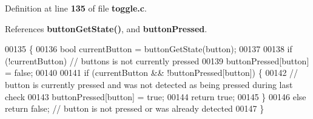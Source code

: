 Definition at line \textbf{ 135} of file \textbf{ toggle.\+c}.



References \textbf{ button\+Get\+State()}, and \textbf{ button\+Pressed}.


\begin{DoxyCode}
00135                                        \{
00136     \textcolor{keywordtype}{bool} currentButton = buttonGetState(button);
00137 
00138     \textcolor{keywordflow}{if} (!currentButton) \textcolor{comment}{// buttons is not currently pressed}
00139         buttonPressed[button] = \textcolor{keyword}{false};
00140 
00141     \textcolor{keywordflow}{if} (currentButton && !buttonPressed[button]) \{
00142         \textcolor{comment}{// button is currently pressed and was not detected as being pressed during last check}
00143         buttonPressed[button] = \textcolor{keyword}{true};
00144         \textcolor{keywordflow}{return} \textcolor{keyword}{true};
00145     \}
00146     \textcolor{keywordflow}{else} \textcolor{keywordflow}{return} \textcolor{keyword}{false}; \textcolor{comment}{// button is not pressed or was already detected}
00147 \}
\end{DoxyCode}
